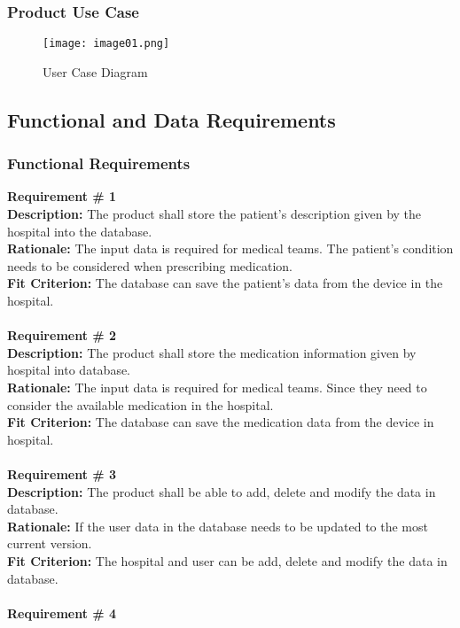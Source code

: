 \documentclass[12pt]{article}
\begin{document}
\subsubsection{Product Use Case}
 
\begin{figure}[ht]
  \texttt{[image: image01.png]}
  \caption{User Case Diagram}
  \label{fig:User Case Diagram}
\end{figure}

\subsection{Functional and Data Requirements}
\subsubsection{Functional Requirements}
{\bf Requirement \# 1} \\
{\bf Description:} The product shall store the patient’s description given by the hospital into the database.  \\
{\bf Rationale:} The input data is required for medical teams. The patient’s condition needs to be considered when prescribing medication. \\
{\bf Fit Criterion:} The database can save the patient’s data from the device in the hospital. \\ \\
{\bf Requirement \# 2}\\
{\bf Description:} The product shall store the medication information given by hospital into database.  \\
{\bf Rationale:} The input data is required for medical teams. Since they need to consider the available medication in the hospital. \\
{\bf Fit Criterion:} The database can save the medication data from the device in hospital. \\ \\
{\bf Requirement \# 3}\\
{\bf Description:} The product shall be able to add, delete and modify the data in database.  \\
{\bf Rationale:} If the user data in the database needs to be updated to the most current version.\\
{\bf Fit Criterion:} The hospital and user can be add, delete and modify the data in database.\\ \\
{\bf Requirement \# 4}\\
\end{document}

